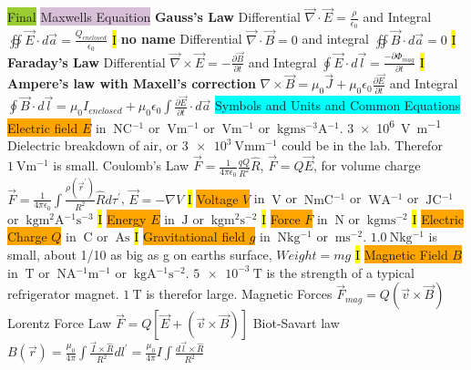 \documentclass[fontsize=4pt]{scrartcl}
\begin{document}
\colorbox{YellowGreen}{Final}
\colorbox{Thistle}{Maxwells Equaition}
\textbf{Gauss's Law} Differential $\vec{\nabla} \cdot \vec{E} = \frac{\rho}{\epsilon_0}$ and Integral $\oiint \vec{E} \cdot d\vec{a} = \frac{Q_{enclosed}}{\epsilon_0}$
\hl{I}
\textbf{no name} Differential $\vec{\nabla} \cdot \vec{B} = 0$ and integral $\oiint \vec{B} \cdot d\vec{a} = 0$
\hl{I}
\textbf{Faraday's Law} Differential $\vec{\nabla} \times \vec{E} = -\frac{\partial \vec{B}}{\partial t} $ and Integral $\oint \vec{E} \cdot d\vec{l} = \frac{-\partial\Phi_{mag}}{\partial t}$
\hl{I}
\textbf{Ampere's law with Maxell's correction} $\nabla \times \vec{B} = \mu_0 \vec{J} + \mu_0 \epsilon_0 \frac{\partial \vec{E}}{\partial t}$ and Integral  $\oint \vec{B} \cdot d\vec{l}= \mu_0 I_{enclosed} + \mu_0 \epsilon_0 \int \frac{\partial \vec{E}}{\partial t} \cdot d\vec{a}$
\colorbox{Cyan}{Symbols and Units and Common Equations}
\colorbox{Orange}{Electric field $E$} in $\SI{}{\newton \coulomb^{-1}}$ or $\SI{}{\volt \meter^{-1}}$ or $\SI{}{\volt \meter^{-1}}$ or $\SI{}{\kilogram \meter \second^{-3} \ampere^{-1}}$. \SI{3e6}{\volt \meter^{-1}} Dielectric breakdown of air, or $\SI{3e3}{\volt \mm^{-1}}$ could be in the lab. Therefor $\SI{1}{\volt \meter^{-1}}$ is small. Coulomb's Law $\vec{F}=\frac{1}{4\pi \epsilon_0}\frac{qQ}{R^2}\hat{R}$, $\vec{F}=Q\vec{E}$, for volume charge $\vec{F}=\frac{1}{4\pi \epsilon_0} \int \frac{\rho(\vec{r}^{\prime})}{R^2}\hat{R}d\tau^{\prime}$, $\vec{E} = -\nabla V$
\hl{I}
\colorbox{Orange}{Voltage $V$} in $\SI{}{\volt}$ or $\SI{}{\newton \meter \coulomb^{-1}}$ or $\SI{}{\watt \ampere ^{-1}}$ or $\SI{}{\joule \coulomb^{-1}}$ or $\SI{}{\kilogram \meter^2\ampere^{-1}\second^{-3}}$ 
\hl{I}
\colorbox{Orange}{Energy $E$} in $\SI{}{\joule}$ or $\SI{}{\kilogram \meter^2 \second^{-2}}$
\hl{I}
\colorbox{Orange}{Force $F$} in $\SI{}{\newton}$ or $\SI{}{\kilogram \meter \second^{-2}}$
\hl{I}
\colorbox{Orange}{Electric Charge $Q$} in $\SI{}{\coulomb}$ or $\SI{}{\ampere \second}$
\hl{I}
\colorbox{Orange}{Gravitational field $g$} in $\SI{}{\newton \kilogram^{-1}}$ or $\SI{}{\meter \second^{-2}}$. $\SI{1.0}{\newton \kilogram^{-1}}$ is small, about 1/10 as big as g on earths surface, $Weight = mg$
\hl{I}
\colorbox{Orange}{Magnetic Field $B$} in  $\SI{}{\tesla}$ or $\SI{}{\newton \ampere^{-1}\meter^{-1}}$ or $\SI{}{\kilogram \ampere^{-1} \second^{-2}}$. $\SI{5e-3}{\tesla}$ is the strength of a typical refrigerator magnet. $\SI{1}{\tesla}$ is therefor large. Magnetic Forces $\vec{F}_{mag} = Q(\vec{v} \times \vec{B})$ Lorentz Force Law $\vec{F}=Q[\vec{E}+(\vec{v} \times \vec{B})]$ Biot-Savart law $B(\vec{r}) = \frac{\mu_0}{4\pi} \int \frac{\vec{I} \times \hat{R}}{R^2} dl^{\prime} = \frac{\mu_0}{4\pi} I \int \frac{d\vec{l} \times \hat{R}}{R^2}$
\end{document}
